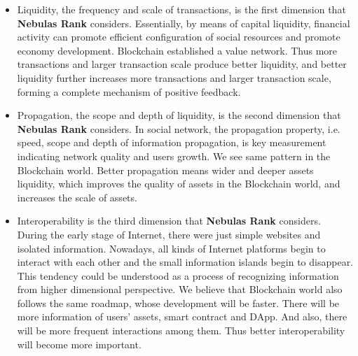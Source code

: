 \begin{itemize}
	\item Liquidity, the frequency and scale of transactions, is the first dimension that \textbf{Nebulas Rank} considers. Essentially, by means of capital liquidity, financial activity can promote efficient configuration of social resources and promote economy development. Blockchain established a value network. Thus more transactions and larger transaction scale produce better liquidity, and better liquidity further increases more transactions and larger transaction scale, forming a complete mechanism of positive feedback.
	\item Propagation, the scope and depth of liquidity, is the second dimension that \textbf{Nebulas Rank} considers. In social network, the propagation property, i.e. speed, scope and depth of information propagation, is key measurement indicating network quality and users growth. We see same pattern in the Blockchain world. Better propagation means wider and deeper assets liquidity, which improves the quality of assets in the Blockchain world, and increases the scale of assets.
	\item Interoperability is the third dimension that \textbf{Nebulas Rank} considers. During the early stage of Internet, there were just simple websites and isolated information. Nowadays, all kinds of Internet platforms begin to interact with each other and the small information islands begin to disappear. This tendency could be understood as a process of recognizing information from higher dimensional perspective. We believe that Blockchain world also follows the same roadmap, whose development will be faster. There will be more information of users' assets, smart contract and DApp. And also, there will be more frequent interactions among them. Thus better interoperability will become more important.
\end{itemize}

